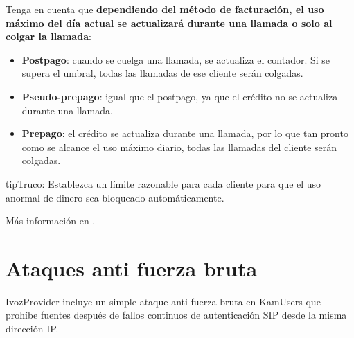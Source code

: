 \documentclass[letterpaper,10pt,spanish]{sphinxmanual}
\begin{document}
Tenga en cuenta que \textbf{dependiendo del método de facturación, el uso máximo del día actual se actualizará durante una llamada o solo al colgar la llamada}:
\begin{itemize}
\item {} 
\textbf{Postpago}: cuando se cuelga una llamada, se actualiza el contador. Si se supera el umbral, todas las llamadas de ese cliente serán colgadas.

\item {} 
\textbf{Pseudo-prepago}: igual que el postpago, ya que el crédito no se actualiza durante una llamada.

\item {} 
\textbf{Prepago}: el crédito se actualiza durante una llamada, por lo que tan pronto como se alcance el uso máximo diario, todas las llamadas del cliente serán colgadas.

\end{itemize}

\begin{notice}{tip}{Truco:}
Establezca un límite razonable para cada cliente para que el uso anormal de dinero sea bloqueado automáticamente.
\end{notice}

Más información en {\hyperref[administration_portal/brand/billing/current_day_usages:current\string-day\string-usages]{}}.


\section{Ataques anti fuerza bruta}
\label{security_and_maintenance/security/antibruteforce:anti-brute-force-attacks}\label{security_and_maintenance/security/antibruteforce::doc}\label{security_and_maintenance/security/antibruteforce:id1}
IvozProvider incluye un simple ataque anti fuerza bruta en KamUsers que prohíbe fuentes después de fallos continuos de autenticación SIP desde la misma dirección IP.
\end{document}
